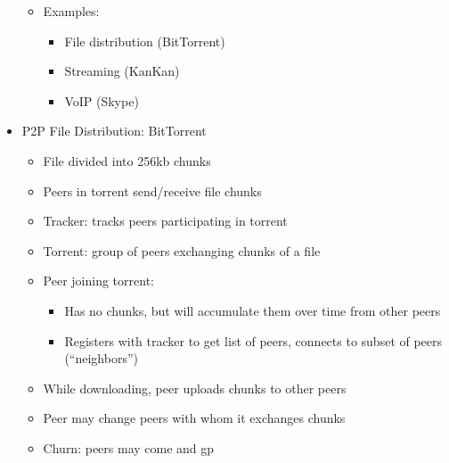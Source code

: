 \begin{itemize}
\begin{itemize}
      \item Examples:

        \begin{itemize}

          \item File distribution (BitTorrent)

          \item Streaming (KanKan)

          \item VoIP (Skype)

        \end{itemize}

    \end{itemize}

  \item P2P File Distribution: BitTorrent

    \begin{itemize}

      \item File divided into 256kb chunks

      \item Peers in torrent send/receive file chunks

      \item Tracker: tracks peers participating in torrent

      \item Torrent: group of peers exchanging chunks of a file

      \item Peer joining torrent:

        \begin{itemize}

          \item Has no chunks, but will accumulate them over time from other peers

          \item Registers with tracker to get list of peers, connects to subset of peers (``neighbors'')

        \end{itemize}

      \item While downloading, peer uploads chunks to other peers

      \item Peer may change peers with whom it exchanges chunks

      \item Churn: peers may come and gp


\end{itemize}
\end{itemize}
